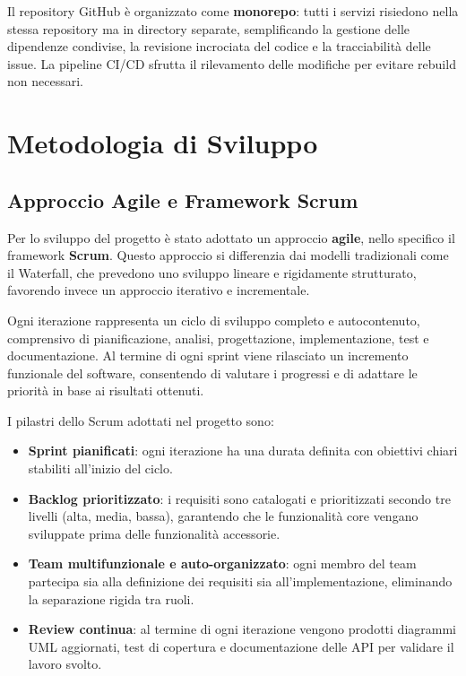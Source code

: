 \documentclass[12pt,a4paper,twoside]{report}
\begin{document}
Il repository GitHub è organizzato come \textbf{monorepo}: tutti i servizi risiedono nella stessa repository ma in directory separate, semplificando la gestione delle dipendenze condivise, la revisione incrociata del codice e la tracciabilità delle issue. La pipeline CI/CD sfrutta il rilevamento delle modifiche per evitare rebuild non necessari.

\chapter{Metodologia di Sviluppo}

\section{Approccio Agile e Framework Scrum}

Per lo sviluppo del progetto è stato adottato un approccio \textbf{agile}, nello specifico il framework \textbf{Scrum}. Questo approccio si differenzia dai modelli tradizionali come il Waterfall, che prevedono uno sviluppo lineare e rigidamente strutturato, favorendo invece un approccio iterativo e incrementale.

Ogni iterazione rappresenta un ciclo di sviluppo completo e autocontenuto, comprensivo di pianificazione, analisi, progettazione, implementazione, test e documentazione. Al termine di ogni sprint viene rilasciato un incremento funzionale del software, consentendo di valutare i progressi e di adattare le priorità in base ai risultati ottenuti.

I pilastri dello Scrum adottati nel progetto sono:
\begin{itemize}
  \item \textbf{Sprint pianificati}: ogni iterazione ha una durata definita con obiettivi chiari stabiliti all'inizio del ciclo.
  \item \textbf{Backlog prioritizzato}: i requisiti sono catalogati e prioritizzati secondo tre livelli (alta, media, bassa), garantendo che le funzionalità core vengano sviluppate prima delle funzionalità accessorie.
  \item \textbf{Team multifunzionale e auto-organizzato}: ogni membro del team partecipa sia alla definizione dei requisiti sia all'implementazione, eliminando la separazione rigida tra ruoli.
  \item \textbf{Review continua}: al termine di ogni iterazione vengono prodotti diagrammi UML aggiornati, test di copertura e documentazione delle API per validare il lavoro svolto.
\end{itemize}
\end{document}
